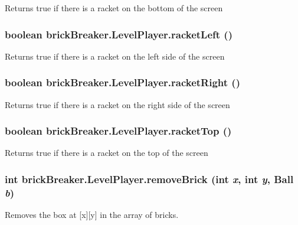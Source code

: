 \label{classbrick_breaker_1_1_level_player_a6a7980415c6fed32a9f6c9271bae6220}
Returns true if there is a racket on the bottom of the screen \hypertarget{classbrick_breaker_1_1_level_player_ad4ab8305c27d7ee5a1c4a05488705a53}{
\subsubsection[{racketLeft}]{\setlength{\rightskip}{0pt plus 5cm}boolean brickBreaker.LevelPlayer.racketLeft ()}}
\label{classbrick_breaker_1_1_level_player_ad4ab8305c27d7ee5a1c4a05488705a53}
Returns true if there is a racket on the left side of the screen \hypertarget{classbrick_breaker_1_1_level_player_a95c24168beb56156276b636954f210bc}{
\subsubsection[{racketRight}]{\setlength{\rightskip}{0pt plus 5cm}boolean brickBreaker.LevelPlayer.racketRight ()}}
\label{classbrick_breaker_1_1_level_player_a95c24168beb56156276b636954f210bc}
Returns true if there is a racket on the right side of the screen \hypertarget{classbrick_breaker_1_1_level_player_ae31f4ca8b38e813587e795d681edfb0d}{
\subsubsection[{racketTop}]{\setlength{\rightskip}{0pt plus 5cm}boolean brickBreaker.LevelPlayer.racketTop ()}}
\label{classbrick_breaker_1_1_level_player_ae31f4ca8b38e813587e795d681edfb0d}
Returns true if there is a racket on the top of the screen \hypertarget{classbrick_breaker_1_1_level_player_a6aa16018bbba510ef65b6d43baaf8dc3}{
\subsubsection[{removeBrick}]{\setlength{\rightskip}{0pt plus 5cm}int brickBreaker.LevelPlayer.removeBrick (int {\em x}, \/  int {\em y}, \/  {\bf Ball} {\em b})}}
\label{classbrick_breaker_1_1_level_player_a6aa16018bbba510ef65b6d43baaf8dc3}
Removes the box at \mbox{[}x\mbox{]}\mbox{[}y\mbox{]} in the array of bricks.



